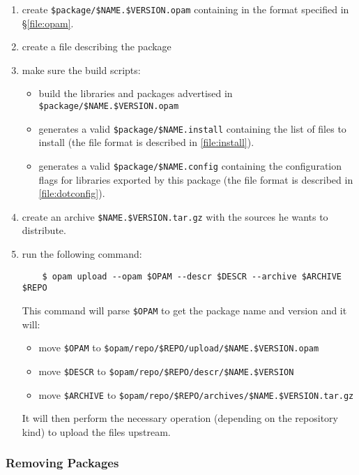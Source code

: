 \documentclass[a4paper,11pt]{article}
\begin{document}
\begin{enumerate}

\item create \verb+$package/$NAME.$VERSION.opam+ containing in the format
  specified in \S\ref{file:opam}.

\item create a file describing the package

\item make sure the build scripts:
\begin{itemize}
\item build the libraries and packages advertised in
  \verb+$package/$NAME.$VERSION.opam+
\item generates a valid \verb+$package/$NAME.install+ containing the
  list of files to install (the file format is described in
  \ref{file:install}).
\item generates a valid \verb+$package/$NAME.config+ containing the
  configuration flags for libraries exported by this package (the file
  format is described in \ref{file:dotconfig}).
\end{itemize}

\item create an archive \verb+$NAME.$VERSION.tar.gz+ with the sources he
  wants to distribute.

\item run the following command:

\begin{verbatim}
    $ opam upload --opam $OPAM --descr $DESCR --archive $ARCHIVE $REPO
\end{verbatim}

This command will parse \verb+$OPAM+ to get the package name and
version and it will:
\begin{itemize}
\item move \verb+$OPAM+ to \verb+$opam/repo/$REPO/upload/$NAME.$VERSION.opam+
\item move \verb+$DESCR+ to \verb+$opam/repo/$REPO/descr/$NAME.$VERSION+
\item move \verb+$ARCHIVE+ to \verb+$opam/repo/$REPO/archives/$NAME.$VERSION.tar.gz+
\end{itemize}

It will then perform the necessary operation (depending on the
repository kind) to upload the files upstream.

\end{enumerate}

\subsubsection{Removing Packages}
\label{opam-remove}
\end{document}
